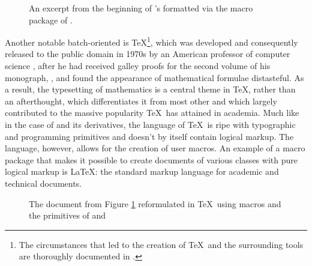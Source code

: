 \documentclass[
  a5paper,10pt,           %
  dvipsnames              %
]{book}
\begin{document}
\begin{figure}
  \caption{An excerpt from the beginning of 's
     formatted
    via the  macro package of .}
  \label{fig:poe}
\end{figure}


Another notable batch-oriented  is \TeX{}\footnote{
  The circumstances that led to the creation of \TeX\ and the surrounding tools
  are thoroughly documented in .
}, which was developed and consequently released to the public domain in 1970s
by an American professor of computer science , after he had
received galley proofs for the second volume of his monograph, , and found the appearance of mathematical formulae
distasteful. As a result, the typesetting of mathematics is a central theme in
\TeX, rather than an afterthought, which differentiates it from most other
 and which largely contributed to the massive popularity \TeX\ has
attained in academia. Much like in the case of  and its
derivatives, the language of \TeX\ is ripe with typographic and programming
primitives and doesn't by itself contain logical markup. The language, however,
allows for the creation of user macros. An example of a macro package that makes
it possible to create documents of various classes with pure logical markup is
\LaTeX{}: the standard markup language for academic and
technical documents.

\begin{figure}
  \caption{The document from Figure \ref{fig:poe} reformulated in \TeX\ using
     macros and the primitives of  and
    }
\end{figure}
\end{document}
